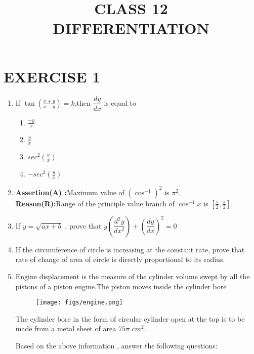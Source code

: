 \documentclass{article}
\providecommand{\sbrak}[1]{\ensuremath{{}\left[#1\right]}}
\providecommand{\brak}[1]{\ensuremath{\left(#1\right)}}
\begin{document}
\title{CLASS 12\\DIFFERENTIATION}
\date{}
\maketitle
\section{EXERCISE 1}
\begin{enumerate}
	\item If $\tan \brak{\frac{x+y}{x-y}}=k$,then $\dfrac{dy}{dx}$ is equal to 
		\begin{enumerate}
			\item $\frac{-y}{x}$
   \item $\frac{y}{x}$
			
			\item $sec^{2}\brak{\frac{y}{x}}$ 
   \item $-sec^{2}\brak{\frac{y}{x}}$ 
			
   \end{enumerate}
  \item  \textbf{Assertion(A) :}Maximum value of $\brak{{\cos^{-1}}}^2$ is ${{\pi}^2}$.\\
  \textbf{Reason(R):}Range of the principle value branch of ${{\cos^{-1}x}}$ is $\sbrak{{\frac{\pi}{2}},{\frac{\pi}{2}}}$.\\
	\item If $y=\sqrt{ax+b}$ , prove that $y\brak{\dfrac{d^2y}{dx^2}}+\brak{\dfrac{dy}{dx}}^2=0$ 
 \item If the circumference of circle is increasing at the constant rate, prove that rate of change of area of circle is directly proportional to its radius.
 \newpage
 \item Engine displacement is the measure of the cylinder volume swept by all the pistons of a piston engine.The piston moves inside the cylinder bore  
  \begin{figure}[!ht]
\centering
\texttt{[image: figs/engine.png]}
\end{figure}
    

 The cylinder bore in the form of circular cylinder open at the top is to be made from a metal sheet of area ${75\pi}$ ${cm}^2.$ \newline

 Based on the above information , answer the following questions: \newline


\end{enumerate}
\end{document}
